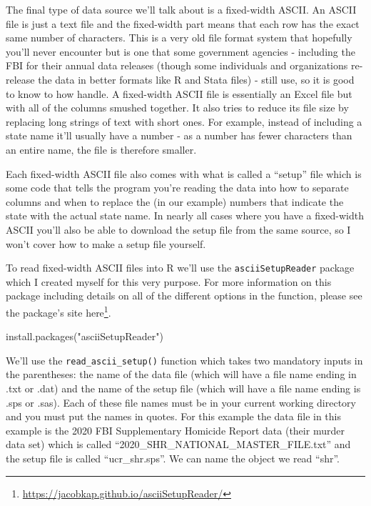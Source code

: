 \documentclass[
]{krantz}
\makeatletter
\newenvironment{Shaded}{\begin{snugshade}}{\end{snugshade}}
\newcommand{\FunctionTok}[1]{\textcolor[rgb]{0,0,0}{#1}}
\newcommand{\NormalTok}[1]{#1}
\newcommand{\StringTok}[1]{\textcolor[rgb]{0.5,0.5,0.5}{#1}}
\renewcommand{\href}[2]{#2\footnote{\url{#1}}}
\newenvironment{kframe}{%
\medskip{}
\setlength{\fboxsep}{.8em}
 \def\at@end@of@kframe{}%
 \ifinner\ifhmode%
  \def\at@end@of@kframe{\end{minipage}}%
  \begin{minipage}{\columnwidth}%
 \fi\fi%
 \def\FrameCommand##1{\hskip\@totalleftmargin \hskip-\fboxsep
 \colorbox{shadecolor}{##1}\hskip-\fboxsep
     \hskip-\linewidth \hskip-\@totalleftmargin \hskip\columnwidth}%
 \MakeFramed {\advance\hsize-\width
   \@totalleftmargin\z@ \linewidth\hsize
   \@setminipage}}%
 {\par\unskip\endMakeFramed%
 \at@end@of@kframe}
\renewenvironment{Shaded}{\begin{kframe}}{\end{kframe}}
\makeatother
\begin{document}
The final type of data source we'll talk about is a
fixed-width ASCII. An ASCII file is just a text file and the
fixed-width part means that each row has the exact same
number of characters. This is a very old file format system
that hopefully you'll never encounter but is one that some
government agencies - including the FBI for their annual
data releases (though some individuals and organizations
re-release the data in better formats like R and Stata
files) - still use, so it is good to know to how handle. A
fixed-width ASCII file is essentially an Excel file but with
all of the columns smushed together. It also tries to reduce
its file size by replacing long strings of text with short
ones. For example, instead of including a state name it'll
usually have a number - as a number has fewer characters
than an entire name, the file is therefore smaller.

Each fixed-width ASCII file also comes with what is called a
``setup'' file which is some code that tells the program
you're reading the data into how to separate columns and
when to replace the (in our example) numbers that indicate
the state with the actual state name. In nearly all cases
where you have a fixed-width ASCII you'll also be able to
download the setup file from the same source, so I won't
cover how to make a setup file yourself.

To read fixed-width ASCII files into R we'll use the
\texttt{asciiSetupReader} package which I created myself for
this very purpose. For more information on this package
including details on all of the different options in the
function, please see the package's site
\href{https://jacobkap.github.io/asciiSetupReader/}{here}.

\begin{Shaded}
\begin{Highlighting}[]
\FunctionTok{install.packages}\NormalTok{(}\StringTok{"asciiSetupReader"}\NormalTok{)}
\end{Highlighting}
\end{Shaded}

We'll use the \texttt{read\_ascii\_setup()} function which
takes two mandatory inputs in the parentheses: the name of
the data file (which will have a file name ending in .txt or
.dat) and the name of the setup file (which will have a file
name ending is .sps or .sas). Each of these file names must
be in your current working directory and you must put the
names in quotes. For this example the data file in this
example is the 2020 FBI Supplementary Homicide Report data
(their murder data set) which is called
``2020\_SHR\_NATIONAL\_MASTER\_FILE.txt'' and the setup file
is called ``ucr\_shr.sps''. We can name the object we read
``shr''.
\end{document}

